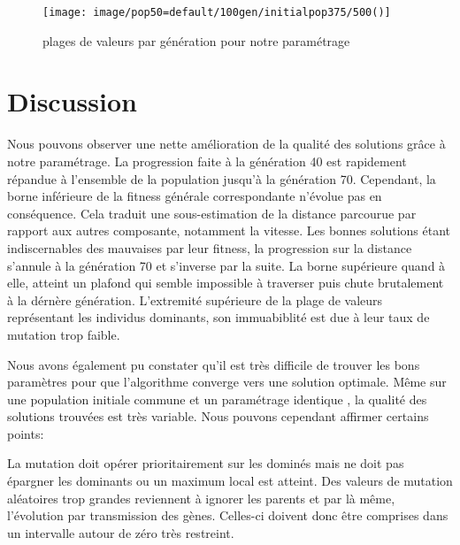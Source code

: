 \documentclass[journal, a4paper]{IEEEtran}
\begin{document}
\begin{figure}[!hbt]
  \texttt{[image: image/pop50=default/100gen/initialpop375/500()]}
  \caption{plages de valeurs par génération pour notre paramétrage}
  \label{fig:300tournament14elit2()}
\end{figure}


\section{Discussion}
	Nous pouvons observer une nette amélioration de la qualité des solutions
	grâce à notre paramétrage.
	La progression faite à la génération 40 est rapidement répandue
	à l'ensemble de la population jusqu'à la génération 70.
	Cependant, la borne inférieure de la fitness générale
	correspondante n'évolue pas en conséquence.
	Cela traduit une sous-estimation de la distance parcourue par
	rapport aux autres composante, notamment la vitesse.
	Les bonnes solutions étant indiscernables des mauvaises par leur fitness,
	la progression sur la distance s'annule à la génération 70 et
	s'inverse	par	la
	suite.
	La borne supérieure quand à elle, atteint un plafond qui semble
	impossible à traverser puis chute brutalement à la dérnère génération.
	L'extremité supérieure de la plage de valeurs représentant
	les individus dominants, son immuabiblité est due à leur taux
	de mutation trop faible.

	Nous avons également pu constater qu'il est très difficile
	de trouver les bons paramètres pour que l'algorithme converge
	vers une solution optimale.
	Même sur une population initiale commune et un paramétrage identique
	, la qualité des solutions trouvées est très variable.
	Nous pouvons cependant affirmer certains points:

	La mutation doit opérer prioritairement sur les dominés mais
	ne doit pas épargner les dominants ou un maximum local est atteint.
	Des valeurs de mutation aléatoires trop grandes reviennent à
	ignorer les parents et par là même, l'évolution par transmission
	des gènes.
	Celles-ci doivent donc être comprises dans un
	intervalle autour de zéro très restreint.
\end{document}
